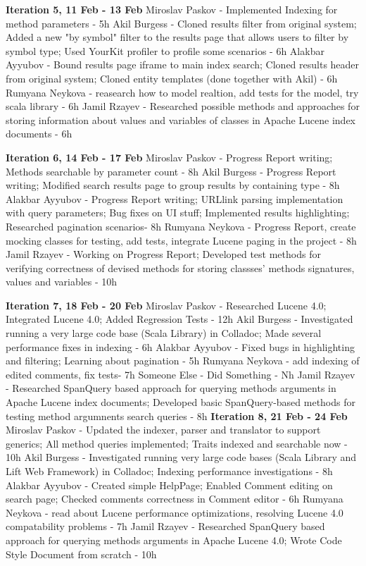 \textbf{Iteration 5, 11 Feb - 13 Feb}
Miroslav Paskov - Implemented Indexing for method parameters - 5h
Akil Burgess -  Cloned results filter from original system; Added a new "by symbol" filter to the results page that allows users to filter by symbol type; Used YourKit profiler to profile some scenarios - 6h
Alakbar Ayyubov -  Bound results page iframe to main index search; Cloned results header from original system; Cloned entity templates (done together with Akil) - 6h
Rumyana Neykova - reasearch how to model realtion, add tests for the model, try scala library - 6h 
Jamil Rzayev - Researched possible methods and approaches for storing information about values and variables of classes in Apache Lucene index documents - 6h

\textbf{Iteration 6, 14 Feb - 17 Feb}
Miroslav Paskov - Progress Report writing; Methods searchable by parameter count - 8h
Akil Burgess - Progress Report writing; Modified search results page to group results by containing type - 8h
Alakbar Ayyubov - Progress Report writing; URLlink parsing implementation with query parameters; Bug fixes on UI stuff; Implemented results highlighting; Researched pagination scenarios- 8h
Rumyana Neykova - Progress Report, create mocking classes for testing, add tests, integrate Lucene paging in the project - 8h 
Jamil Rzayev - Working on Progress Report; Developed test methods for verifying correctness of devised methods for storing classses’ methods signatures, values and variables - 10h

\textbf{Iteration 7, 18 Feb - 20 Feb}
Miroslav Paskov - Researched Lucene 4.0; Integrated Lucene 4.0; Added Regression Tests - 12h
Akil Burgess - Investigated running a very large code base (Scala Library) in Colladoc; Made several performance fixes in indexing - 6h
Alakbar Ayyubov - Fixed bugs in highlighting and filtering; Learning about pagination - 5h 
Rumyana Neykova - add indexing of edited comments, fix tests- 7h
Someone Else - Did Something - Nh
Jamil Rzayev - Researched SpanQuery based approach for querying methods arguments in Apache Lucene index documents; Developed basic SpanQuery-based methods for testing method argumnents search queries - 8h
\textbf{Iteration 8, 21 Feb - 24 Feb}
Miroslav Paskov - Updated the indexer, parser and translator to support generics; All method queries implemented; Traits indexed and searchable now - 10h
Akil Burgess - Investigated running very large code bases (Scala Library and Lift Web Framework) in Colladoc; Indexing performance investigations - 8h
Alakbar Ayyubov - Created simple HelpPage; Enabled Comment editing on search page; Checked comments correctness in Comment editor - 6h
Rumyana Neykova - read about Lucene performance optimizations, resolving Lucene 4.0 compatability problems - 7h 
Jamil Rzayev - Researched SpanQuery based approach for querying methods arguments in Apache Lucene 4.0; Wrote Code Style Document from scratch - 10h

